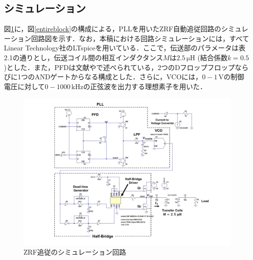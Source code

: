 \subsection{シミュレーション}
図\ref{pllsimulationcircuit}に，図\ref{entireblock}の構成による，PLLを用いたZRF自動追従回路のシミュレーション回路図を示す．なお，本稿における回路シミュレーションには，すべてLinear Technology社のLTspiceを用いている．ここで，伝送部のパラメータは表2.1の通りとし，伝送コイル間の相互インダクタンス$M$は$2.5 \, \mathrm{\mu H}$ (結合係数$k=0.5$)とした．また，PFDは文献\cite{Enzaka2014}や\cite{Razavi2004}で述べられている，2つのDフロップフロップならびに1つのANDゲートからなる構成とした．さらに，VCOには，$0-1 \, \mathrm{V}$の制御電圧に対して$0-1000 \, \mathrm{kHz}$の正弦波を出力する理想素子を用いた．

\begin{figure}[H]
\begin{center}

\includegraphics[width=145mm]{figures/pllsimulationcircuit.pdf}
\caption{ZRF追従のシミュレーション回路}
\label{pllsimulationcircuit}

\end{center}
\end{figure}

